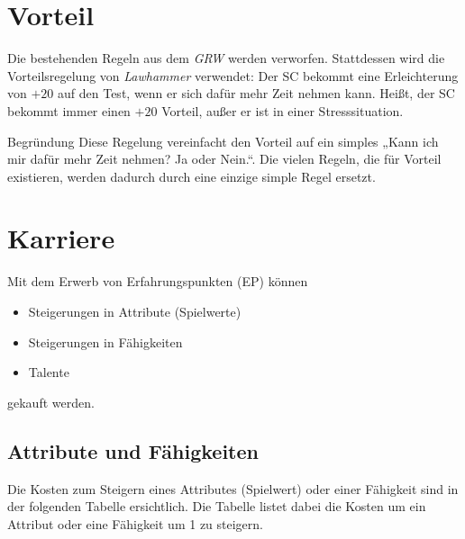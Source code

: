 \documentclass[a4paper,10pt,twoside,twocolumn,openany,nodeprecatedcode,bg=print]{dndbook}
\begin{document}

\section{Vorteil}
Die bestehenden Regeln aus dem \textit{GRW} werden verworfen.
Stattdessen wird die Vorteilsregelung von \textit{Lawhammer} verwendet: Der SC bekommt eine Erleichterung von $+20$ auf den Test, wenn er sich dafür mehr Zeit nehmen kann. Heißt, der SC bekommt immer einen $+20$ Vorteil, außer er ist in einer Stresssituation.

\begin{DndComment}{Begründung}
  Diese Regelung vereinfacht den Vorteil auf ein simples „Kann ich mir dafür mehr Zeit nehmen? Ja oder Nein.“. Die vielen Regeln, die für Vorteil existieren, werden dadurch durch eine einzige simple Regel ersetzt.
\end{DndComment}


\vspace{\fill}
\pagebreak

\section{Karriere}
Mit dem Erwerb von Erfahrungspunkten (EP) können
\begin{itemize}
  \item Steigerungen in Attribute (Spielwerte)
  \item Steigerungen in Fähigkeiten
  \item Talente
\end{itemize}
gekauft werden.

\subsection[short]{Attribute und Fähigkeiten}

Die Kosten zum Steigern eines Attributes (Spielwert) oder einer Fähigkeit sind in der folgenden Tabelle ersichtlich. Die Tabelle listet dabei die Kosten um ein Attribut oder eine Fähigkeit um 1 zu steigern.
\end{document}
